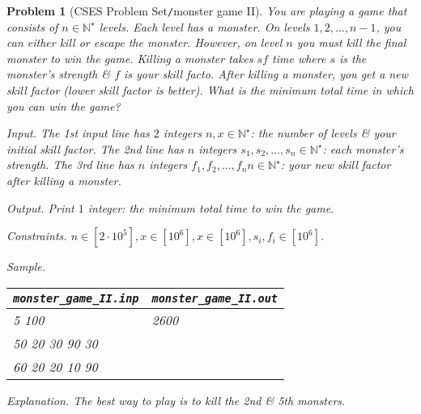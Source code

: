 \documentclass{article}
\newtheorem{problem}{Problem}
\begin{document}
\begin{problem}[CSES Problem Set{\tt/}monster game II]
    You are playing a game that consists of $n\in\mathbb{N}^\star$ levels. Each level has a monster. On levels $1,2,\ldots,n - 1$, you can either kill or escape the monster. However, on level $n$ you must kill the final monster to win the game. Killing a monster takes $sf$ time where $s$ is the monster's strength \& $f$ is your skill facto. After killing a monster, you get a new skill factor (lower skill factor is better). What is the minimum total time in which you can win the game?
    \item {\sf Input.} The 1st input line has $2$ integers $n,x\in\mathbb{N}^\star$: the number of levels \& your initial skill factor. The 2nd line has $n$ integers $s_1,s_2,\ldots,s_n\in\mathbb{N}^\star$: each monster's strength. The 3rd line has $n$ integers $f_1,f_2,\ldots,f_nn\in\mathbb{N}^\star$: your new skill factor after killing a monster.
    \item {\sf Output.} Print $1$ integer: the minimum total time to win the game.
    \item {\sf Constraints.} $n\in[2\cdot10^5],x\in[10^6],x\in[10^6],s_i,f_i\in[10^6]$.
    \item {\sf Sample.}
    \begin{table}[H]
        \centering
        \begin{tabular}{|l|l|}
            \hline
            \verb|monster_game_II.inp| & \verb|monster_game_II.out| \\
            \hline
            5 100 & 2600 \\
            50 20 30 90 30 & \\
            60 20 20 10 90 & \\
            \hline
        \end{tabular}
    \end{table}
    \item {\sf Explanation.} The best way to play is to kill the 2nd \& 5th monsters.
\end{problem}
\end{document}
